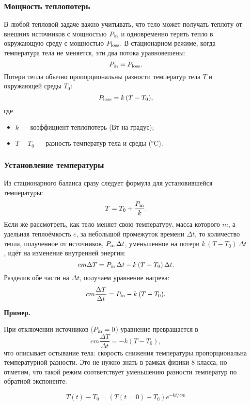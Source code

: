 \documentclass[12pt, a4paper]{article}%
\begin{document}
\subsubsection*{Мощность теплопотерь}
В любой тепловой задаче важно учитывать, что тело может получать теплоту от внешних источников с мощностью $P_{\rm in}$ 
и одновременно терять тепло в окружающую среду с мощностью $P_{\rm loss}$. В стационарном режиме, когда температура тела не меняется, эти два потока уравновешены:
\[
P_{\rm in}=P_{\rm loss}.
\]
Потери тепла обычно пропорциональны разности температур тела $T$ и окружающей среды $T_{0}$:
\[
P_{\rm loss}=k\,(T-T_{0}),
\]
где
\begin{itemize}
  \item $k$ — коэффициент теплопотерь (Вт на градус);
  \item $T-T_{0}$ — разность температур тела и среды (°C).
\end{itemize}

\subsubsection*{Установление температуры}

Из стационарного баланса сразу следует формула для установившейся температуры:
\[
T=T_{0}+\frac{P_{\rm in}}{k}.
\]
Если же рассмотреть, как тело меняет свою температуру, масса которого $m$, а удельная теплоёмкость $c$, за небольшой промежуток времени $\Delta t$, то количество тепла, полученное от источников, $P_{\rm in}\,\Delta t$, уменьшенное на потери $k\,(T-T_{0})\,\Delta t$, идёт на изменение внутренней энергии:
\[
cm\Delta T=P_{\rm in}\,\Delta t - k\,(T-T_{0})\,\Delta t.
\]
Разделив обе части на $\Delta t$, получаем уравнение нагрева:
\[
cm\frac{\Delta T}{\Delta t}=P_{\rm in}-k\,(T-T_{0}).
\]


\textbf{Пример.} 

При отключении источников ($P_{\rm in}=0$) уравнение превращается в
\[
cm\frac{\Delta T}{\Delta t}=-k(T-T_{0}),
\]
что описывает остывание тела: скорость снижения температуры пропорциональна температурной разности. Это не нужно знать в рамках физики 8 класса, но отметим, что такой режим соответствует уменьшению разности температур по обратной экспоненте:

\[
T(t)-T_0 = (T(t=0)-T_0)e^{-kt/cm}
\]
\end{document}
